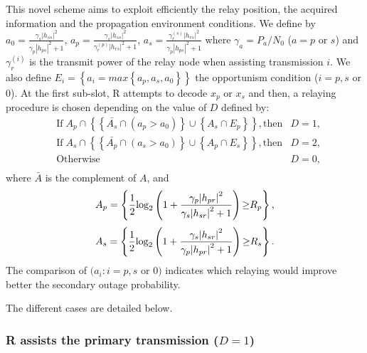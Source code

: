 \documentclass[conference,twocolumn]{IEEEtran}
\begin{document}
This novel scheme aims to exploit efficiently the relay position, the acquired information and the
propagation environment conditions. We define by $a_0=\frac{\gamma_s |h_{ss}|^2}{\gamma_p |h_{ps}|^2+1}$, $a_p=\frac{\gamma_s |h_{ss}|^2}{\gamma_r^{(p)} |h_{rs}|^2+1}$, $a_s=\frac{\gamma_r^{(s)} |h_{rs}|^2}{\gamma_p |h_{ps}|^2+1}$ where $\gamma_a=P_a/N_0$ ($a=p$ or $s$) and $\gamma_{r}^{(i)}$ is the transmit power of the relay node when assisting transmission $i$. We also define $E_i=\left\{ a_i=max\left\{ a_p, a_s, a_0 \right\} \right\}$ the opportunism condition ($i=p, s$ or $0$).
At the first sub-slot, R attempts to decode $x_p$ or $x_s$  and then, a relaying procedure is chosen depending on the value of $D$ defined by:
\begin{eqnarray}
\label{eq:condition_CR_helps_PU_SU}
\nonumber &\mathrm{If }\;A_p \cap \left\{ \left\{\bar{A_s} \cap (a_p > a_0)\right\} \cup \left\{A_s \cap E_p \right\} \right\} \mathrm{, then} &D = 1,\\
\nonumber &\mathrm{If }\;A_s \cap \left\{ \left\{\bar{A_p} \cap (a_s > a_0)\right\} \cup \left\{A_p \cap E_s \right\} \right\} \mathrm{, then} &D = 2,\\
\nonumber &\mathrm{Otherwise} &D = 0,\\
\end{eqnarray}
where $\bar{A}$ is the complement of $A$, and
\begin{equation}
A_p = \left\{\frac{1}{2}{{\log }_2}\left( {1 + \frac{{\gamma _p}{{\left| {h_{pr}} \right|}^2}}{{\gamma _s}{{\left| {h_{sr}} \right|}^2}+1}} \right){\rm{ \geq }}{R_p}\right\},
\end{equation}
\begin{equation}
A_s = \left\{\frac{1}{2}{{\log }_2}\left( {1 + \frac{{\gamma _s}{{\left| {h_{sr}} \right|}^2}}{{\gamma _p}{{\left| {h_{pr}} \right|}^2}+1}} \right){\rm{ \geq }}{R_s}\right\}.
\end{equation}
The comparison of $(a_i: i = p, s$ or $0)$ indicates which relaying would improve better the secondary outage probability.

The different cases are detailed below.

\subsubsection{R assists the primary transmission ($D=1$)}
\end{document}
